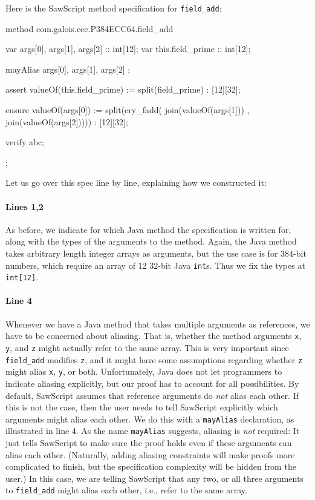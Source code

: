\documentclass[12pt]{galois-whitepaper}
\newcommand{\sawScript}{{\sc SawScript}\xspace}
\begin{document}
Here is the \sawScript method specification for {\tt field\_add}:
\begin{code}[numbers=left]
  method com.galois.ecc.P384ECC64.field_add {
    var args[0], args[1], args[2] :: int[12];
    var this.field_prime :: int[12];
  
    mayAlias { args[0], args[1], args[2] };
  
    assert valueOf(this.field_prime) := split(field_prime) : [12][32];
  
    ensure valueOf(args[0]) := 
        split(cry_fadd( join(valueOf(args[1]))
                      , join(valueOf(args[2])))) : [12][32];
  
    verify abc;
  };
\end{code}
Let us go over this spec line by line, explaining how we constructed it:

\paragraph{Lines 1,2} As before, we indicate for which Java method the specification is written for, along with the types of the
arguments to the method. Again, the Java method takes arbitrary length integer arrays as arguments, but the use case
is for 384-bit numbers, which require an array of 12 32-bit Java {\tt int}s. Thus we fix the types at {\tt int[12]}.

\paragraph{Line 4} Whenever we have a Java method that takes multiple arguments as references, we have to be
concerned about aliasing. That is, whether the method arguments {\tt x}, {\tt y}, and {\tt z} might actually refer
to the same array. This is very important since {\tt field\_add} modifies {\tt z}, and it might have some
assumptions regarding whether {\tt z} might alias {\tt x}, {\tt y}, or both. Unfortunately, Java does not let programmers
to indicate aliasing explicitly, but our proof has to account for all possibilities.
By default, \sawScript assumes that reference arguments do {\em not} alias each other.
If this is not the case, then the user needs to tell \sawScript explicitly which arguments might alias each other. We do
this with a {\tt mayAlias} declaration, as illustrated in line 4. As the name {\tt mayAlias}
suggests, aliasing is {\em not} required: It just tells \sawScript to make sure the proof holds even if these arguments
can alias each other. (Naturally, adding aliasing constraints will make proofs more complicated to finish, but the specification complexity
will be hidden from the user.) In this case, we are telling
\sawScript that any two, or all three arguments to {\tt field\_add} might alias each other, i.e., refer to the same array.
\end{document}
